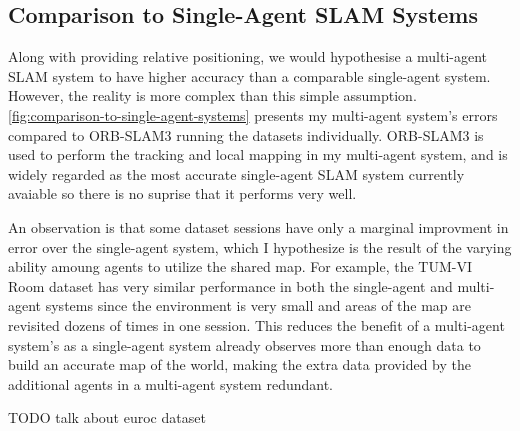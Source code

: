 \subsection{Comparison to Single-Agent SLAM Systems}
Along with providing relative positioning, we would hypothesise a multi-agent SLAM system to have higher accuracy than a comparable single-agent system. However, the reality is more complex than this simple assumption. \autoref{fig:comparison-to-single-agent-systems} presents my multi-agent system's errors compared to ORB-SLAM3 running the datasets individually. ORB-SLAM3 is used to perform the tracking and local mapping in my multi-agent system, and is widely regarded as the most accurate single-agent SLAM system currently avaiable so there is no suprise that it performs very well.

An observation is that some dataset sessions have only a marginal improvment in error over the single-agent system, which I hypothesize is the result of the varying ability amoung agents to utilize the shared map. For example, the TUM-VI Room dataset has very similar performance in both the single-agent and multi-agent systems since the environment is very small and areas of the map are revisited dozens of times in one session. This reduces the benefit of a multi-agent system's as a single-agent system already observes more than enough data to build an accurate map of the world, making the extra data provided by the additional agents in a multi-agent system redundant.

TODO talk about euroc dataset


